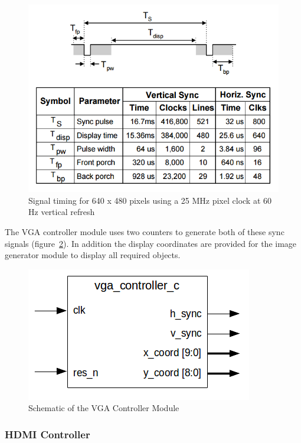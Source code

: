 	        \begin{figure}[h]
		        \centering
		        \includegraphics[scale=0.4]{images/vga_timing.png}
		        \caption{Signal timing for 640 x 480 pixels using a 25 MHz pixel clock at 60 Hz vertical refresh}
		        \label{vga_timing}
	        \end{figure}
            The VGA controller module uses two counters to generate both of these sync signals (figure~\ref{vga_sch}). In addition the display coordinates are provided for the image generator module to display all required objects.
	        \begin{figure}[h]
		        \centering
		        \includegraphics[scale=0.7]{images/vga_schematic.png}
		        \caption{Schematic of the VGA Controller Module}
		        \label{vga_sch}
	        \end{figure}

        \subsubsection{HDMI Controller}

